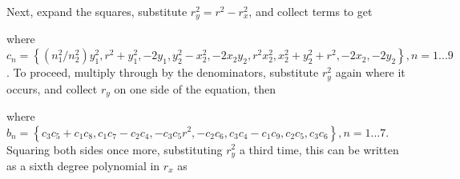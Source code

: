Next, expand the squares, substitute $r_y^2 = r^2 - r_x^2$, and collect terms to get 

%
%


\noindent where $c_n = \left\{(n_1^2/n_2^2)  y_1^2, r^2+ y_1^2, - 2y_1, y_2^2 -  x_2^2, -2 x_2y_2, r^2x_2^2, x_2^2 + y_2^2+ r^2, - 2x_2, - 2y_2\right\}, n = 1... 9$. To proceed, multiply through by the denominators, substitute $r_y^2$ again where it occurs, and collect $r_y$ on one side of the equation, then 

\noindent where $b_n = \left\{c_3 c_5 + c_1 c_8,  c_1 c_7 - c_2 c_4, -c_3 c_5 r^2, -c_2c_6, c_3c_4 - c_1 c_9, c_2c_5, c_3c_6\right\}, n = 1...7$.  Squaring both sides once more, substituting $r_y^2$ a third time, this can be written as a sixth degree polynomial in $r_x$ as


